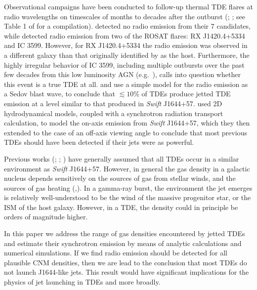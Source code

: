 \documentclass[usenatbib,fleqn]{mnras}
\begin{document}
Observational campaigns have been conducted to follow-up thermal TDE
flares at radio wavelengths on timescales of months to decades after
the outburst (\citealt{Bower+2013}; \citealt{van-Velzen+2013}; see Table
1 of \citet{Mimica+2015} for a compilation).  \citet{van-Velzen+2013}
detected no radio emission from their 7 candidates, while
\citet{Bower+2013} detected radio emission from two of the  ROSAT flares:
RX J1420.4+5334 and IC 3599.  However, for RX J1420.4+5334 the radio
emission was observed in a different galaxy than that originally
identified by \citet{Komossa+1999} as the host.  Furthermore, the
highly irregular behavior of IC 3599, including multiple outbursts
over the past few decades from this low luminosity AGN
(e.g.~\citealt{Campana+2015}), calls into question whether this event is
a true TDE at all.  \citet{Bower+2013} and \citet{van-Velzen+2013} use a
simple model for the radio emission as a Sedov blast wave, to conclude
that $\lesssim 10\%$ of TDEs produce jetted TDE emission at a level
similar to that produced in {\it Swift} J1644+57.  \citet{Mimica+2015}
used 2D hydrodynamical models, coupled with a synchrotron radiation
transport calculation, to model the on-axis emission from {\it Swift}
J1644+57, which they then extended to the case of an off-axis viewing
angle to conclude that most previous TDEs should have been detected if
their jets were as powerful.

Previous works (\citet{Bower+2013}; \citet{van-Velzen+2013};
\citealt{Mimica+2015}) have generally assumed that all TDEs occur in a
similar environment as {\it Swift} J1644+57.  However, in general the
gas density in a galactic nucleus depends sensitively on the sources
of gas from stellar winds, and the sources of gas heating
(\citealt{Quataert2004},\citealt{Generozov+2015}).  In a gamma-ray
burst, the environment the jet emerges is relatively well-understood
to be the wind of the massive progenitor star, or the ISM of the host
galaxy.  However, in a TDE, the density could in principle be orders
of magnitude higher.

In this paper we address the range of gas densities encountered by
jetted TDEs and estimate their synchrotron emission by means of
analytic calculations and numerical simulations.  If we find radio
emission should be detected for all plausible CNM densities, then we
are lead to the conclusion that most TDEs do not launch J1644-like
jets.  This result would have significant implications for the physics
of jet launching in TDEs and more broadly.
\end{document}

